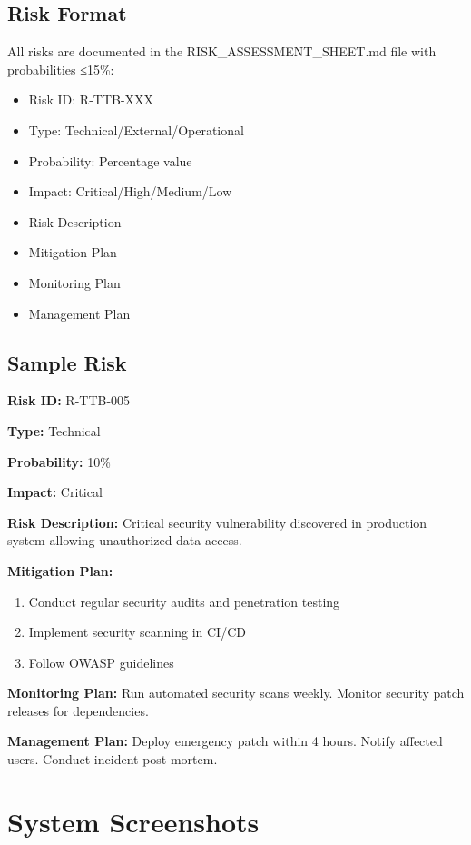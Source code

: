 \documentclass[12pt,a4paper]{report}
\begin{document}
\section{Risk Format}
All risks are documented in the RISK\_ASSESSMENT\_SHEET.md file with probabilities ≤15\%:
\begin{itemize}[leftmargin=*]
    \item Risk ID: R-TTB-XXX
    \item Type: Technical/External/Operational
    \item Probability: Percentage value
    \item Impact: Critical/High/Medium/Low
    \item Risk Description
    \item Mitigation Plan
    \item Monitoring Plan
    \item Management Plan
\end{itemize}

\section{Sample Risk}
\textbf{Risk ID:} R-TTB-005

\textbf{Type:} Technical

\textbf{Probability:} 10\%

\textbf{Impact:} Critical

\textbf{Risk Description:} Critical security vulnerability discovered in production system allowing unauthorized data access.

\textbf{Mitigation Plan:}
\begin{enumerate}
    \item Conduct regular security audits and penetration testing
    \item Implement security scanning in CI/CD
    \item Follow OWASP guidelines
\end{enumerate}

\textbf{Monitoring Plan:} Run automated security scans weekly. Monitor security patch releases for dependencies.

\textbf{Management Plan:} Deploy emergency patch within 4 hours. Notify affected users. Conduct incident post-mortem.

\chapter{System Screenshots}
\end{document}
